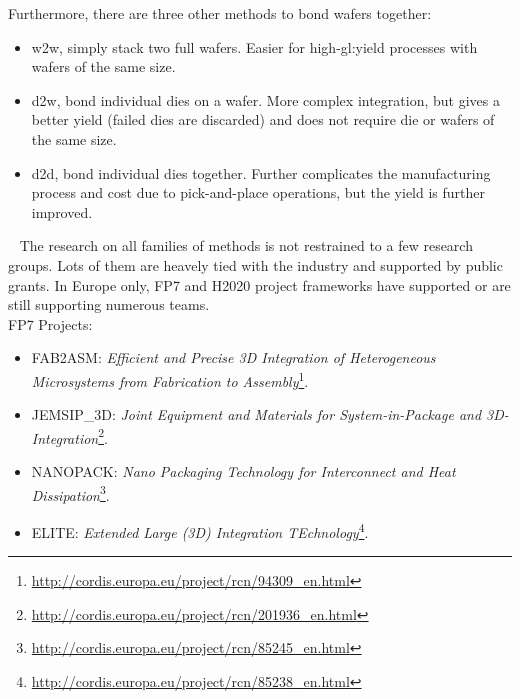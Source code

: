 \documentclass[11pt,a4paper]{report} %
\theoremstyle{customdef}
\begin{document}
Furthermore, there are three other methods to bond wafers together: 
\begin{itemize}
	\item \gls{w2w}, simply stack two full wafers. Easier for high-\gls{gl:yield} processes with wafers of the same size.
	\item \gls{d2w}, bond individual dies on a wafer. More complex integration, but gives a better yield (failed dies are discarded) and does not require die or wafers of the same size.
	\item \gls{d2d}, bond individual dies together. Further complicates the manufacturing process and cost due to pick-and-place operations, but the yield is further improved.
\end{itemize}


~\newline{}
The research on all families of methods is not restrained to a few research groups.
Lots of them are heavely tied with the industry and supported by public grants.
In Europe only, FP7 and H2020 project frameworks have supported or are still supporting numerous teams.\\

FP7 Projects:
\begin{itemize}
	\item FAB2ASM: \textit{Efficient and Precise 3D Integration of Heterogeneous Microsystems from Fabrication to Assembly}\footnote{\url{http://cordis.europa.eu/project/rcn/94309_en.html}}.

	\item JEMSIP\_3D: \textit{Joint Equipment and Materials for System-in-Package and 3D-Integration}\footnote{\url{http://cordis.europa.eu/project/rcn/201936_en.html}}.
	\item NANOPACK: \textit{Nano Packaging Technology for Interconnect and Heat Dissipation}\footnote{\url{http://cordis.europa.eu/project/rcn/85245_en.html}}.
	\item ELITE: \textit{Extended Large (3D) Integration TEchnology}\footnote{\url{http://cordis.europa.eu/project/rcn/85238_en.html}}.
\end{itemize}
\end{document}
